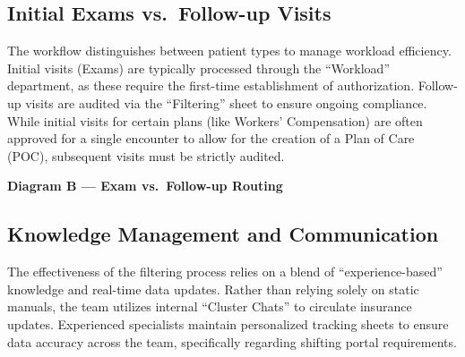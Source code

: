 \documentclass[11pt,a4paper]{article}
\begin{document}
\subsection{Initial Exams vs.\ Follow-up Visits}

The workflow distinguishes between patient types to manage workload efficiency. Initial visits (Exams) are typically processed through the ``Workload'' department, as these require the first-time establishment of authorization. Follow-up visits are audited via the ``Filtering'' sheet to ensure ongoing compliance. While initial visits for certain plans (like Workers' Compensation) are often approved for a single encounter to allow for the creation of a Plan of Care (POC), subsequent visits must be strictly audited.

\vspace{0.4em}
\begin{center}
\textbf{\color{AccentTeal}Diagram B --- Exam vs.\ Follow-up Routing}\\[0.5em]
\end{center}

\subsection{Knowledge Management and Communication}

The effectiveness of the filtering process relies on a blend of ``experience-based'' knowledge and real-time data updates. Rather than relying solely on static manuals, the team utilizes internal ``Cluster Chats'' to circulate insurance updates. Experienced specialists maintain personalized tracking sheets to ensure data accuracy across the team, specifically regarding shifting portal requirements.
\end{document}
